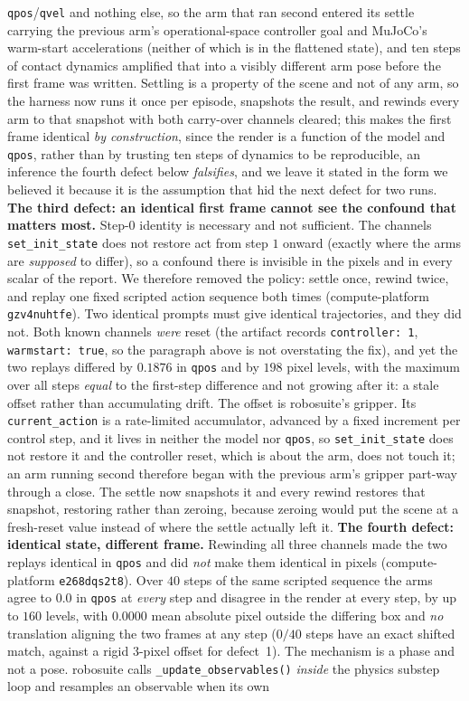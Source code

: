 \documentclass{article}
\begin{document}
\texttt{qpos}/\texttt{qvel} and nothing else, so the arm that ran second entered its settle carrying the previous arm's operational-space controller goal and MuJoCo's warm-start accelerations (neither of which is in the flattened state), and ten steps of contact dynamics amplified that into a visibly different arm pose before the first frame was written. Settling is a property of the scene and not of any arm, so the harness now runs it once per episode, snapshots the result, and rewinds every arm to that snapshot with both carry-over channels cleared; this makes the first frame identical \emph{by construction}, since the render is a function of the model and \texttt{qpos}, rather than by trusting ten steps of dynamics to be reproducible, an inference the fourth defect below \emph{falsifies}, and we leave it stated in the form we believed it because it is the assumption that hid the next defect for two runs. \textbf{The third defect: an identical first frame cannot see the confound that matters most.} Step-$0$ identity is necessary and not sufficient. The channels \texttt{set\_init\_state} does not restore act from step $1$ onward (exactly where the arms are \emph{supposed} to differ), so a confound there is invisible in the pixels and in every scalar of the report. We therefore removed the policy: settle once, rewind twice, and replay one fixed scripted action sequence both times (compute-platform \texttt{gzv4nuhtfe}). Two identical prompts must give identical trajectories, and they did not. Both known channels \emph{were} reset (the artifact records \texttt{controller:\ 1}, \texttt{warmstart:\ true}, so the paragraph above is not overstating the fix), and yet the two replays differed by $0.1876$ in \texttt{qpos} and by $198$ pixel levels, with the maximum over all steps \emph{equal} to the first-step difference and not growing after it: a stale offset rather than accumulating drift. The offset is robosuite's gripper. Its \texttt{current\_action} is a rate-limited accumulator, advanced by a fixed increment per control step, and it lives in neither the model nor \texttt{qpos}, so \texttt{set\_init\_state} does not restore it and the controller reset, which is about the arm, does not touch it; an arm running second therefore began with the previous arm's gripper part-way through a close. The settle now snapshots it and every rewind restores that snapshot, restoring rather than zeroing, because zeroing would put the scene at a fresh-reset value instead of where the settle actually left it. \textbf{The fourth defect: identical state, different frame.} Rewinding all three channels made the two replays identical in \texttt{qpos} and did \emph{not} make them identical in pixels (compute-platform \texttt{e268dqs2t8}). Over $40$ steps of the same scripted sequence the arms agree to $0.0$ in \texttt{qpos} at \emph{every} step and disagree in the render at every step, by up to $160$ levels, with $0.0000$ mean absolute pixel outside the differing box and \emph{no} translation aligning the two frames at any step ($0/40$ steps have an exact shifted match, against a rigid $3$-pixel offset for defect~1). The mechanism is a phase and not a pose. robosuite calls \texttt{\_update\_observables()} \emph{inside} the physics substep loop and resamples an observable when its own 
\end{document}
